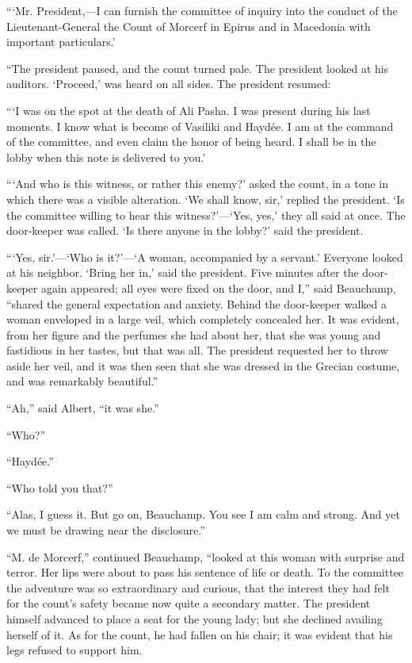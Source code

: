 “‘Mr. President,—I can furnish the committee of inquiry into the
conduct of the Lieutenant-General the Count of Morcerf in Epirus and in
Macedonia with important particulars.’

“The president paused, and the count turned pale. The president looked
at his auditors. ‘Proceed,’ was heard on all sides. The president
resumed:

“‘I was on the spot at the death of Ali Pasha. I was present during his
last moments. I know what is become of Vasiliki and Haydée. I am at the
command of the committee, and even claim the honor of being heard. I
shall be in the lobby when this note is delivered to you.’

“‘And who is this witness, or rather this enemy?’ asked the count, in a
tone in which there was a visible alteration. ‘We shall know, sir,’
replied the president. ‘Is the committee willing to hear this
witness?’—‘Yes, yes,’ they all said at once. The door-keeper was
called. ‘Is there anyone in the lobby?’ said the president.

“‘Yes, sir.’—‘Who is it?’—‘A woman, accompanied by a servant.’ Everyone
looked at his neighbor. ‘Bring her in,’ said the president. Five
minutes after the door-keeper again appeared; all eyes were fixed on
the door, and I,” said Beauchamp, “shared the general expectation and
anxiety. Behind the door-keeper walked a woman enveloped in a large
veil, which completely concealed her. It was evident, from her figure
and the perfumes she had about her, that she was young and fastidious
in her tastes, but that was all. The president requested her to throw
aside her veil, and it was then seen that she was dressed in the
Grecian costume, and was remarkably beautiful.”

“Ah,” said Albert, “it was she.”

“Who?”

“Haydée.”

“Who told you that?”

“Alas, I guess it. But go on, Beauchamp. You see I am calm and strong.
And yet we must be drawing near the disclosure.”

“M. de Morcerf,” continued Beauchamp, “looked at this woman with
surprise and terror. Her lips were about to pass his sentence of life
or death. To the committee the adventure was so extraordinary and
curious, that the interest they had felt for the count’s safety became
now quite a secondary matter. The president himself advanced to place a
seat for the young lady; but she declined availing herself of it. As
for the count, he had fallen on his chair; it was evident that his legs
refused to support him.


